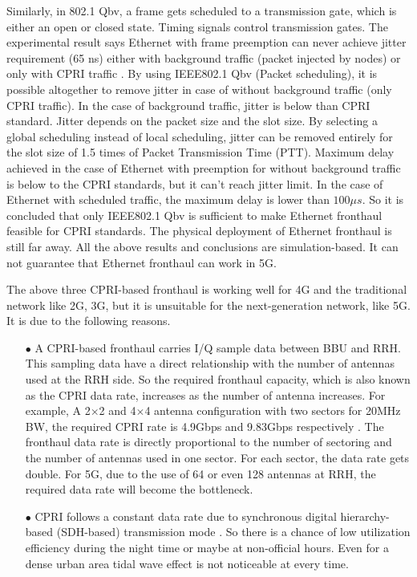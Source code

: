 \begin{multicols}{2}
\begin{itemize}
Similarly, in 802.1 Qbv, a frame gets scheduled to a transmission gate, which is either an open or closed state. Timing signals control transmission gates. The experimental result says Ethernet with frame preemption can never achieve jitter requirement (65 ns) either with background traffic (packet injected by nodes) or only with CPRI traffic \cite{art3-key50}. By using IEEE802.1 Qbv (Packet scheduling), it is possible altogether to remove jitter in case of without background traffic (only CPRI traffic). In the case of background traffic, jitter is below than CPRI standard. Jitter depends on the packet size and the slot size. By selecting a global scheduling instead of local scheduling, jitter can be removed entirely for the slot size of 1.5 times of Packet Transmission Time (PTT). Maximum delay achieved in the case of Ethernet with preemption for without background traffic is below to the CPRI standards, but it can't reach jitter limit. In the case of Ethernet with scheduled traffic, the maximum delay is lower than $100 \mu s$. So it is concluded that only IEEE802.1 Qbv is sufficient to make Ethernet fronthaul feasible for CPRI standards. The physical deployment of Ethernet fronthaul is still far away. All the above results and conclusions are simulation-based. It can not guarantee that Ethernet fronthaul can work in 5G. 

The above three CPRI-based fronthaul is working well for 4G and the traditional network like 2G, 3G, but it is unsuitable for the next-generation network, like 5G. It is due to the following reasons.

\begin{itemize}

\item[$\bullet$] A CPRI-based fronthaul carries I/Q sample data between BBU and RRH. This sampling data have a direct relationship with the number of antennas used at the RRH side. So the required fronthaul capacity, which is also known as the CPRI data rate, increases as the number of antenna increases. For example, A 2$\times$2 and 4$\times$4 antenna configuration with two sectors for 20MHz BW, the required CPRI rate is 4.9Gbps and 9.83Gbps respectively \cite{art3-key39}. The fronthaul data rate is directly proportional to the number of sectoring and the number of antennas used in one sector. For each sector, the data rate gets double. For 5G, due to the use of 64 or even 128 antennas at RRH, the required data rate will become the bottleneck.

\item[$\bullet$] CPRI follows a constant data rate due to synchronous digital hierarchy-based (SDH-based) transmission mode \cite{art3-key35}. So there is a chance of low utilization efficiency during the night time or maybe at non-official hours. Even for a dense urban area tidal wave effect is not noticeable at every time.


\end{itemize}
\end{itemize}
\end{multicols}
